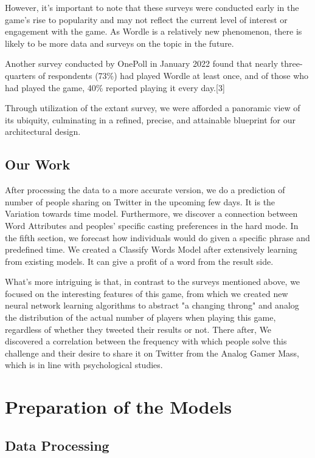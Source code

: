 \documentclass{mcmthesis}
\begin{document}
However, it's important to note that these surveys were conducted early in the game's rise to popularity and may not reflect the current level of interest or engagement with the game. As Wordle is a relatively new phenomenon, there is likely to be more data and surveys on the topic in the future.

Another survey conducted by OnePoll in January 2022 found that nearly three-quarters of respondents (73\%) had played Wordle at least once, and of those who had played the game, 40\% reported playing it every day.[3]

Through utilization of the extant survey, we were afforded a panoramic view of its ubiquity, culminating in a refined, precise, and attainable blueprint for our architectural design.
\subsection{Our Work}
\hspace*{0.6cm}After processing the data to a more accurate version, we do a prediction of number of people sharing on Twitter in the upcoming few days. It is the Variation towards time model. Furthermore, we discover a connection between Word Attributes and peoples' specific casting preferences in the hard mode. In the fifth section, we forecast how individuals would do given a specific phrase and predefined time. We created a Classify Words Model after extensively learning from existing models. It can give a profit of a word from the result side.

What's more intriguing is that, in contrast to the surveys mentioned above, we focused on the interesting features of this game, from which we created new neural network learning algorithms to abstract "a changing throng" and analog the distribution of the actual number of players when playing this game, regardless of whether they tweeted their results or not. There after, We discovered a correlation between the frequency with which people solve this challenge and their desire to share it on Twitter from the Analog Gamer Mass, which is in line with psychological studies.


\section{Preparation of the Models}
\subsection{Data Processing}
\end{document}
